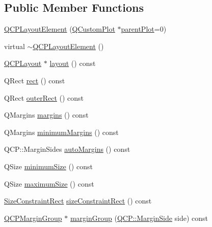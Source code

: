 \subsection*{Public Member Functions}
\begin{DoxyCompactItemize}
\item 
\mbox{\hyperlink{class_q_c_p_layout_element_a8947f0ada17e672aaba3d424cbbb67e3}{Q\+C\+P\+Layout\+Element}} (\mbox{\hyperlink{class_q_custom_plot}{Q\+Custom\+Plot}} $\ast$\mbox{\hyperlink{class_q_c_p_layerable_a473edb813a4c1929d6b6a8fe3ff3faf7}{parent\+Plot}}=0)
\item 
virtual \mbox{\hyperlink{class_q_c_p_layout_element_a0dc52343920011b3e72d61fc94ed3400}{$\sim$\+Q\+C\+P\+Layout\+Element}} ()
\item 
\mbox{\hyperlink{class_q_c_p_layout}{Q\+C\+P\+Layout}} $\ast$ \mbox{\hyperlink{class_q_c_p_layout_element_a4efdcbde9d28f410e5ef166c9d691deb}{layout}} () const
\item 
Q\+Rect \mbox{\hyperlink{class_q_c_p_layout_element_a208effccfe2cca4a0eaf9393e60f2dd4}{rect}} () const
\item 
Q\+Rect \mbox{\hyperlink{class_q_c_p_layout_element_a2a32a12a6161c9dffbadeb9cc585510c}{outer\+Rect}} () const
\item 
Q\+Margins \mbox{\hyperlink{class_q_c_p_layout_element_af4ac9450aa2d60863bf3a8ea0c940c9d}{margins}} () const
\item 
Q\+Margins \mbox{\hyperlink{class_q_c_p_layout_element_a5eae30e28f28d73fd1c56409c011393e}{minimum\+Margins}} () const
\item 
Q\+C\+P\+::\+Margin\+Sides \mbox{\hyperlink{class_q_c_p_layout_element_a2585bc8c5cc70ee712909751a2fc8909}{auto\+Margins}} () const
\item 
Q\+Size \mbox{\hyperlink{class_q_c_p_layout_element_a60d4295468a2b57fe91f6f68e20c3993}{minimum\+Size}} () const
\item 
Q\+Size \mbox{\hyperlink{class_q_c_p_layout_element_afb9503858d4aa0f3b9f1794b084fb40a}{maximum\+Size}} () const
\item 
\mbox{\hyperlink{class_q_c_p_layout_element_a0afb3e5773529e4bd20e448f81be4d2a}{Size\+Constraint\+Rect}} \mbox{\hyperlink{class_q_c_p_layout_element_a66136f121ee3e1c933b748761203cab4}{size\+Constraint\+Rect}} () const
\item 
\mbox{\hyperlink{class_q_c_p_margin_group}{Q\+C\+P\+Margin\+Group}} $\ast$ \mbox{\hyperlink{class_q_c_p_layout_element_a8af6bcf81e12fe1d6f44490f34522b90}{margin\+Group}} (\mbox{\hyperlink{namespace_q_c_p_a7e487e3e2ccb62ab7771065bab7cae54}{Q\+C\+P\+::\+Margin\+Side}} side) const

\end{DoxyCompactItemize}

